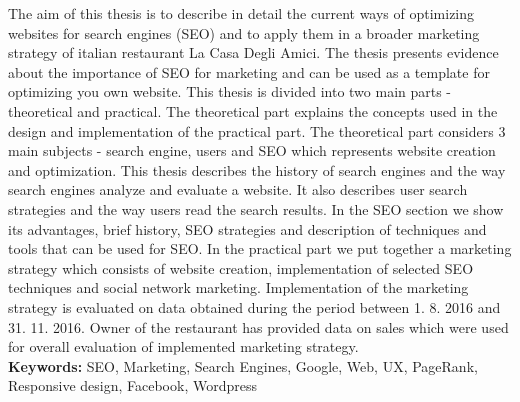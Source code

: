 The aim of this thesis is to describe in detail the current ways of optimizing websites for search engines (SEO) and to apply them in a broader marketing strategy of italian restaurant La Casa Degli Amici. The thesis presents evidence about the importance of SEO for marketing and can be used as a template for optimizing you own website. This thesis is divided into two main parts - theoretical and practical. The theoretical part explains the concepts used in the design and implementation of the practical part. The theoretical part considers 3 main subjects - search engine, users and SEO which represents website creation and optimization. This thesis describes the history of search engines and the way search engines analyze and evaluate a website. It also describes user search strategies and the way users read the search results. In the SEO section we show its advantages, brief history, SEO strategies and description of techniques and tools that can be used for SEO. In the practical part we put together a marketing strategy which consists of website creation, implementation of selected SEO techniques and social network marketing. Implementation of the marketing strategy is evaluated on data obtained during the period between 1. 8. 2016 and 31. 11. 2016. Owner of the restaurant has provided data on sales which were used for overall evaluation of implemented marketing strategy. \\

\textbf{Keywords:} SEO, Marketing, Search Engines, Google, Web, UX, PageRank, Responsive design, Facebook, Wordpress

\newpage\thispagestyle{empty}

\setcounter{secnumdepth}{2}
\setcounter{tocdepth}{2}
\tableofcontents{}

\listoffigures
\begingroup
\let\clearpage\relax
\listoftables
\endgroup
\begingroup
\let\clearpage\relax
\renewcommand{\lstlistlistingname}{Seznam zdrojových kódů}
\lstlistoflistings
\endgroup

\newpage\thispagestyle{empty}
